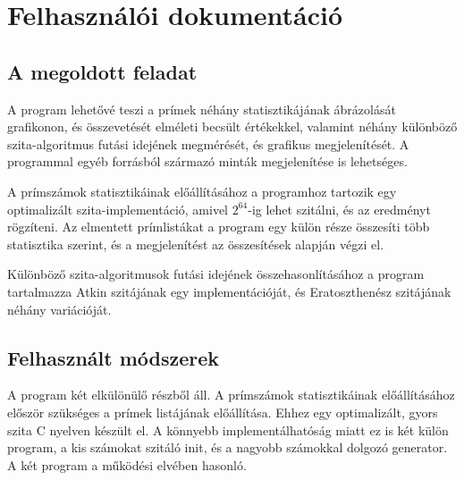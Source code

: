 \chapter{Felhasználói dokumentáció}

\section{A megoldott feladat}

A program lehetővé teszi a prímek néhány statisztikájának ábrázolását grafikonon,
és összevetését elméleti becsült értékekkel, valamint néhány különböző szita-algoritmus
futási idejének megmérését, és grafikus megjelenítését.
A programmal egyéb forrásból származó minták megjelenítése is lehetséges.

A prímszámok statisztikáinak előállításához a programhoz tartozik egy optimalizált
szita-implementáció, amivel $2^{64}$-ig lehet szitálni, és az eredményt rögzíteni.
Az elmentett prímlistákat a program egy külön része összesíti több statisztika szerint,
és a megjelenítést az összesítések alapján végzi el.

Különböző szita-algoritmusok futási idejének összehasonlításához a program tartalmazza
Atkin\cite{atkin} szitájának egy implementációját,
és Eratoszthenész szitájának néhány variációját.

\section{Felhasznált módszerek}

A program két elkülönülő részből áll. A prímszámok statisztikáinak
előállításához először szükséges a prímek listájának előállítása.
Ehhez egy optimalizált, gyors szita C nyelven készült el.
A könnyebb implementálhatóság miatt ez is két külön program, a kis
számokat szitáló init, és a nagyobb számokkal dolgozó generator.
A két program a működési elvében hasonló.

